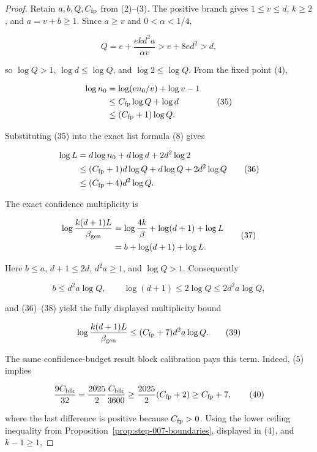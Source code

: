 \begin{proof}
Retain \(a,b,Q,C_{\rm fp}\) from (2)--(3). The  positive
branch gives \(1\leq v\leq d\), \(k\geq2\), and \(a=v+b\geq1\). Since
\(a\geq v\) and \(0<\alpha<1/4\),

\[
 Q=e+\frac{ekd^2a}{\alpha v}>e+8ed^2>d,
 \tag{34}
\]

so \(\log Q>1\), \(\log d\leq\log Q\), and
\(\log2\leq\log Q\). From the  fixed point (4),

\[
\begin{aligned}
 \log n_0
 &=\log(en_0/v)+\log v-1\\
 &\leq C_{\rm fp}\log Q+\log d\\
 &\leq(C_{\rm fp}+1)\log Q.
\end{aligned}
 \tag{35}
\]

Substituting (35) into the exact  list formula (8) gives

\[
\begin{aligned}
 \log L
 &=d\log n_0+d\log d+2d^2\log2\\
 &\leq(C_{\rm fp}+1)d\log Q+d\log Q+2d^2\log Q\\
 &\leq(C_{\rm fp}+4)d^2\log Q.
\end{aligned}
 \tag{36}
\]

The exact confidence multiplicity is

\[
\begin{aligned}
 \log\frac{k(d+1)L}{\beta_{\rm gen}}
 &=\log\frac{4k}{\beta}+\log(d+1)+\log L\\
 &=b+\log(d+1)+\log L.
\end{aligned}
 \tag{37}
\]

Here \(b\leq a\), \(d+1\leq2d\), \(d^2a\geq1\), and \(\log Q>1\).
Consequently

\[
 b\leq d^2a\log Q,
 \qquad
 \log(d+1)\leq2\log Q\leq2d^2a\log Q,
 \tag{38}
\]

and (36)--(38) yield the fully displayed multiplicity bound

\[
 \log\frac{k(d+1)L}{\beta_{\rm gen}}
 \leq(C_{\rm fp}+7)d^2a\log Q.
 \tag{39}
\]

The same confidence-budget result block calibration pays this term. Indeed, (5)
implies

\[
 \frac{9C_{\rm blk}}{32}
 =\frac{2025}{2}\frac{C_{\rm blk}}{3600}
 \geq\frac{2025}{2}(C_{\rm fp}+2)
 \geq C_{\rm fp}+7,
 \tag{40}
\]

where the last difference is positive because \(C_{\rm fp}>0\). Using the
lower ceiling inequality from Proposition~\ref{prop:step-007-boundaries}, displayed in (4), and
\(k-1\geq1\),


\end{proof}
